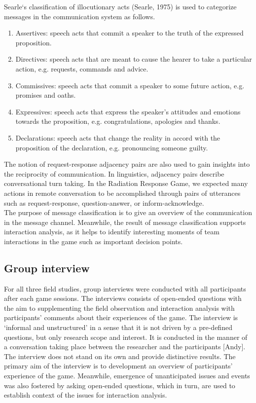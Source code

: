 Searle`s classification of illocutionary acts (Searle, 1975) is used to categorize messages in the communication system as follows.\\

\begin{enumerate}
\item Assertives: speech acts that commit a speaker to the truth of the expressed proposition.
\item Directives: speech acts that are meant to cause the hearer to take a particular action, e.g. requests, commands and advice.
\item Commissives: speech acts that commit a speaker to some future action, e.g. promises and oaths.
\item Expressives: speech acts that express the speaker's attitudes and emotions towards the proposition, e.g. congratulations, apologies and thanks.
\item Declarations: speech acts that change the reality in accord with the proposition of the declaration, e.g. pronouncing someone guilty.
\end{enumerate}

The notion of request-response adjacency pairs are also used to gain insights into the reciprocity of communication. In linguistics, adjacency pairs describe conversational turn taking. In the Radiation Response Game, we expected many actions in remote conversation to be accomplished through pairs of utterances such as request-response, question-answer, or inform-acknowledge.\\

The purpose of message classification is to give an overview of the communication in the message channel. Meanwhile, the result of message classification supports interaction analysis, as it helps to identify interesting moments of team interactions in the game such as important decision points.\\

\subsection{Group interview}
For all three field studies, group interviews were conducted with all participants after each game sessions. The interviews consists of open-ended questions with the aim to supplementing the field observation and interaction analysis with participants' comments about their experiences of the game. The interview is `informal and unstructured' in a sense that it is not driven by a pre-defined questions, but only research scope and interest. It is conducted in the manner of a conversation taking place between the researcher and the participants [Andy].  The interview does not stand on its own and provide distinctive results. The primary aim of the interview is to development an overview of participants' experience of the game. Meanwhile, emergence of unanticipated issues and events was also fostered by asking open-ended questions, which in turn, are used to establish context of the issues for interaction analysis.\\

